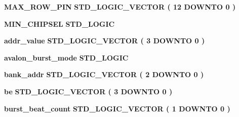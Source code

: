 \begin{DoxyCompactItemize}
\item 
{\bf M\+A\+X\+\_\+\+R\+O\+W\+\_\+\+P\+IN} {\bfseries \textcolor{comment}{S\+T\+D\+\_\+\+L\+O\+G\+I\+C\+\_\+\+V\+E\+C\+T\+OR}\textcolor{vhdlchar}{ }\textcolor{vhdlchar}{(}\textcolor{vhdlchar}{ }\textcolor{vhdlchar}{ } \textcolor{vhdldigit}{12} \textcolor{vhdlchar}{ }\textcolor{keywordflow}{D\+O\+W\+N\+TO}\textcolor{vhdlchar}{ }\textcolor{vhdlchar}{ } \textcolor{vhdldigit}{0} \textcolor{vhdlchar}{ }\textcolor{vhdlchar}{)}\textcolor{vhdlchar}{ }} 
\item 
{\bf M\+I\+N\+\_\+\+C\+H\+I\+P\+S\+EL} {\bfseries \textcolor{comment}{S\+T\+D\+\_\+\+L\+O\+G\+IC}\textcolor{vhdlchar}{ }} 
\item 
{\bf addr\+\_\+value} {\bfseries \textcolor{comment}{S\+T\+D\+\_\+\+L\+O\+G\+I\+C\+\_\+\+V\+E\+C\+T\+OR}\textcolor{vhdlchar}{ }\textcolor{vhdlchar}{(}\textcolor{vhdlchar}{ }\textcolor{vhdlchar}{ } \textcolor{vhdldigit}{3} \textcolor{vhdlchar}{ }\textcolor{keywordflow}{D\+O\+W\+N\+TO}\textcolor{vhdlchar}{ }\textcolor{vhdlchar}{ } \textcolor{vhdldigit}{0} \textcolor{vhdlchar}{ }\textcolor{vhdlchar}{)}\textcolor{vhdlchar}{ }} 
\item 
{\bf avalon\+\_\+burst\+\_\+mode} {\bfseries \textcolor{comment}{S\+T\+D\+\_\+\+L\+O\+G\+IC}\textcolor{vhdlchar}{ }} 
\item 
{\bf bank\+\_\+addr} {\bfseries \textcolor{comment}{S\+T\+D\+\_\+\+L\+O\+G\+I\+C\+\_\+\+V\+E\+C\+T\+OR}\textcolor{vhdlchar}{ }\textcolor{vhdlchar}{(}\textcolor{vhdlchar}{ }\textcolor{vhdlchar}{ } \textcolor{vhdldigit}{2} \textcolor{vhdlchar}{ }\textcolor{keywordflow}{D\+O\+W\+N\+TO}\textcolor{vhdlchar}{ }\textcolor{vhdlchar}{ } \textcolor{vhdldigit}{0} \textcolor{vhdlchar}{ }\textcolor{vhdlchar}{)}\textcolor{vhdlchar}{ }} 
\item 
{\bf be} {\bfseries \textcolor{comment}{S\+T\+D\+\_\+\+L\+O\+G\+I\+C\+\_\+\+V\+E\+C\+T\+OR}\textcolor{vhdlchar}{ }\textcolor{vhdlchar}{(}\textcolor{vhdlchar}{ }\textcolor{vhdlchar}{ } \textcolor{vhdldigit}{3} \textcolor{vhdlchar}{ }\textcolor{keywordflow}{D\+O\+W\+N\+TO}\textcolor{vhdlchar}{ }\textcolor{vhdlchar}{ } \textcolor{vhdldigit}{0} \textcolor{vhdlchar}{ }\textcolor{vhdlchar}{)}\textcolor{vhdlchar}{ }} 
\item 
{\bf burst\+\_\+beat\+\_\+count} {\bfseries \textcolor{comment}{S\+T\+D\+\_\+\+L\+O\+G\+I\+C\+\_\+\+V\+E\+C\+T\+OR}\textcolor{vhdlchar}{ }\textcolor{vhdlchar}{(}\textcolor{vhdlchar}{ }\textcolor{vhdlchar}{ } \textcolor{vhdldigit}{1} \textcolor{vhdlchar}{ }\textcolor{keywordflow}{D\+O\+W\+N\+TO}\textcolor{vhdlchar}{ }\textcolor{vhdlchar}{ } \textcolor{vhdldigit}{0} \textcolor{vhdlchar}{ }\textcolor{vhdlchar}{)}\textcolor{vhdlchar}{ }} 

\end{DoxyCompactItemize}
